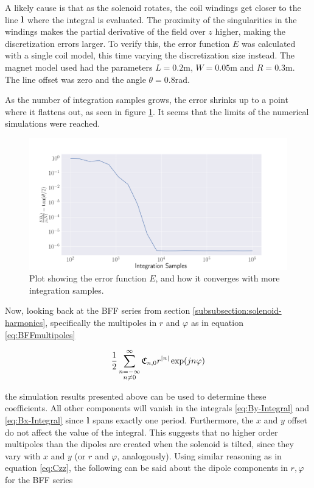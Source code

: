 A likely cause is that as the solenoid rotates, the coil windings
get closer to the line $\vb{l}$ where the integral is evaluated. The
proximity of the singularities in the windings makes the partial derivative
of the field over $z$ higher, making the discretization errors larger.
To verify this, the error function $E$ was calculated with a single coil
model, this time varying the discretization size instead. The magnet model
used had the parameters $L=0.2$m, $W=0.05$m and $R=0.3$m. The line offset
was zero and the angle $\theta=0.8$rad.

As the number
of integration samples grows, the error shrinks up to a point where it
flattens out, as seen in figure \ref{fig:ByInt-Error-convergence}. It seems
that the limits of the numerical simulations were reached.

\begin{figure}[h!]
    \centering
    \includegraphics[width=\linewidth]{figs/ByInt-Convergence.png}
    \caption{Plot showing the error function $E$, and how it converges with
        more integration samples.}
    \label{fig:ByInt-Error-convergence}
\end{figure}

Now, looking back at the BFF series from section
\ref{subsubsection:solenoid-harmonics}, specifically the
multipoles in $r$ and $\varphi$ as in equation \ref{eq:BFFmultipoles}

\begin{equation}
    \frac{1}{2} \sum\limits_{\substack{n=-\infty\\n\neq 0}}^\infty \mathfrak{C}_{n,0} r^{|n|}\exp(jn\varphi)
    \label{eq:BFFmultipoles}
\end{equation}

the simulation results presented above can be used to determine
these coefficients. All other components will vanish in the
integrals \ref{eq:By-Integral} and \ref{eq:Bx-Integral} since
$\vb{l}$ spans exactly one period. Furthermore, the
$x$ and $y$ offset do not affect the value of the integral.
This suggests that no higher order multipoles than the dipoles are
created when the solenoid is tilted, since they vary with $x$ and $y$ 
(or $r$ and $\varphi$, analogously). Using similar reasoning as
in equation \ref{eq:Czz}, the following can be said about the
dipole components in $r, \varphi$ for the BFF series

